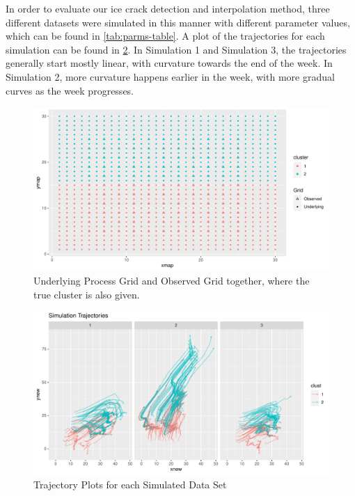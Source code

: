 \documentclass[12pt]{article}
\begin{document}
In order to evaluate our ice crack detection and interpolation method,
three different datasets were simulated in this manner with different
parameter values, which can be found in \cref{tab:parms-table}. A plot
of the trajectories for each simulation can be found in
\cref{fig:traj-wrap}. In Simulation 1 and Simulation 3, the trajectories
generally start mostly linear, with curvature towards the end of the
week. In Simulation 2, more curvature happens earlier in the week, with
more gradual curves as the week progresses.

\begin{figure}[tbp]

{\centering \includegraphics[width=\linewidth,]{spatio-temporal-model-arctic-sea-ice_files/figure-latex/grids-combined-1} 

}

\caption[Simulation Grids]{Underlying Process Grid and Observed Grid together, where the true cluster is also given.}\label{fig:grids-combined}
\end{figure}

\begin{figure}[tbp]

{\centering \includegraphics[width=\linewidth,]{spatio-temporal-model-arctic-sea-ice_files/figure-latex/traj-wrap-1} 

}

\caption{Trajectory Plots for each Simulated Data Set }\label{fig:traj-wrap}
\end{figure}
\end{document}
